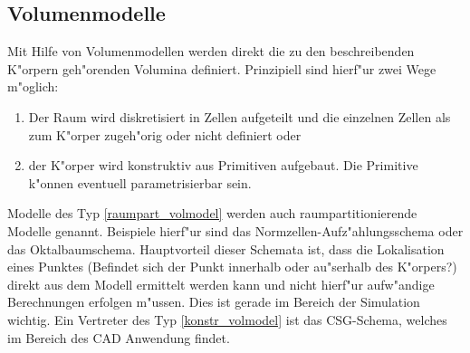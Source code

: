 %
%

\subsection{Volumenmodelle}
\label{volmodels}
Mit Hilfe von Volumenmodellen werden direkt die zu den beschreibenden 
K"orpern geh"orenden Volumina definiert. Prinzipiell sind hierf"ur zwei 
Wege m"oglich:
\begin{enumerate}
\item \label{raumpart_volmodel} Der Raum wird diskretisiert in Zellen 
    aufgeteilt und die einzelnen Zellen als zum K"orper zugeh"orig oder 
    nicht definiert oder
\item \label{konstr_volmodel} der K"orper wird konstruktiv aus Primitiven 
    aufgebaut. Die Primitive k"onnen eventuell parametrisierbar sein.
\end{enumerate}
Modelle des Typ \ref{raumpart_volmodel} werden auch raumpartitionierende 
Modelle genannt. Beispiele hierf"ur sind das Normzellen-Aufz"ahlungsschema 
oder das Oktalbaumschema. Hauptvorteil dieser Schemata ist, dass die 
Lokalisation eines Punktes (Befindet sich der Punkt innerhalb oder 
au"serhalb des K"orpers?) direkt aus dem Modell ermittelt werden kann und 
nicht hierf"ur aufw"andige Berechnungen erfolgen m"ussen. Dies ist gerade 
im Bereich der Simulation wichtig. Ein Vertreter des Typ 
\ref{konstr_volmodel} ist das CSG-Schema, welches im Bereich des CAD 
Anwendung findet.

